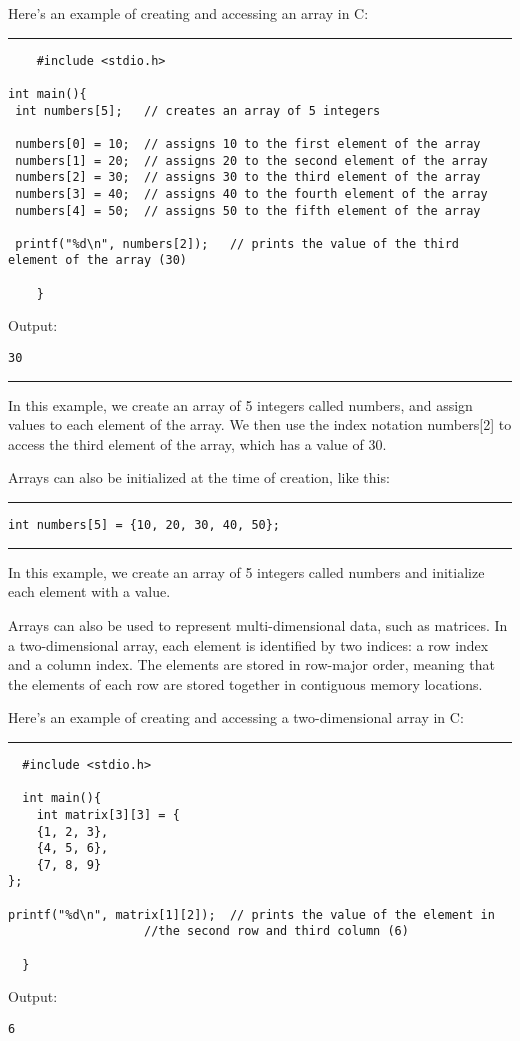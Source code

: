 \documentclass[a4paper]{article}
\begin{document}
Here's an example of creating and accessing an array in C:

\noindent\rule{\textwidth}{0.5pt}
\begin{verbatim}
	#include <stdio.h>

int main(){
 int numbers[5];   // creates an array of 5 integers

 numbers[0] = 10;  // assigns 10 to the first element of the array
 numbers[1] = 20;  // assigns 20 to the second element of the array
 numbers[2] = 30;  // assigns 30 to the third element of the array
 numbers[3] = 40;  // assigns 40 to the fourth element of the array
 numbers[4] = 50;  // assigns 50 to the fifth element of the array

 printf("%d\n", numbers[2]);   // prints the value of the third element of the array (30)

	}
\end{verbatim}
Output:
\begin{verbatim}
30
\end{verbatim}

\noindent\rule{\textwidth}{0.5pt}
In this example, we create an array of 5 integers called numbers, and assign
values to each element of the array. We then use the index notation numbers[2]
to access the third element of the array, which has a value of 30.


Arrays can also be initialized at the time of creation, like this:

\noindent\rule{\textwidth}{0.5pt}
\begin{verbatim}
int numbers[5] = {10, 20, 30, 40, 50};
\end{verbatim}

\noindent\rule{\textwidth}{0.5pt}
In this example, we create an array of 5 integers called numbers and initialize
each element with a value.


Arrays can also be used to represent multi-dimensional data, such as
matrices. In a two-dimensional array, each element is identified by two indices:
a row index and a column index. The elements are stored in row-major order,
meaning that the elements of each row are stored together in contiguous memory
locations.


Here's an example of creating and accessing a two-dimensional array in C:

\noindent\rule{\textwidth}{0.5pt}
\begin{verbatim}
  #include <stdio.h>

  int main(){
    int matrix[3][3] = {
    {1, 2, 3},
    {4, 5, 6},
    {7, 8, 9}
};

printf("%d\n", matrix[1][2]);  // prints the value of the element in
			       //the second row and third column (6)

  }
\end{verbatim}
Output:
\begin{verbatim}
6
\end{verbatim}
\end{document}
